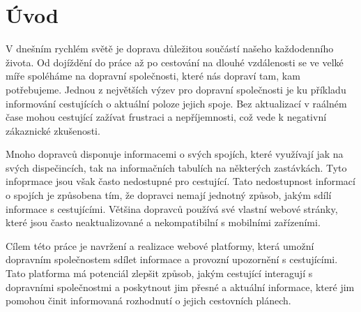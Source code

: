 \chapter{Úvod}
V dnešním rychlém světě je doprava důležitou součástí našeho každodenního života. Od dojíždění do práce až po cestování na dlouhé vzdálenosti se ve velké míře spoléháme na dopravní společnosti, které nás dopraví tam, kam potřebujeme. Jednou z největších výzev pro dopravní společnosti je ku příkladu informování cestujících o aktuální poloze jejich spoje. Bez aktualizací v raálném čase mohou cestující zažívat frustraci a nepříjemnosti, což vede k negativní zákaznické zkušenosti.\par
\hfill\par

Mnoho dopravců disponuje informacemi o svých spojích, které využívají jak na svých dispečincích, tak na informačních tabulích na některých zastávkách. Tyto infoprmace jsou však často nedostupné pro cestující. Tato nedostupnost informací o spojích je způsobena tím, že dopravci nemají jednotný způsob, jakým sdílí informace s cestujícími. Většina dopravců používá své vlastní webové stránky, které jsou často neaktualizované a nekompatibilní s mobilními zařízeními.\par
\hfill\par
Cílem této práce je navržení a realizace webové platformy, která umožní dopravním společnostem sdílet informace a provozní upozornění s cestujícími. Tato platforma má potenciál zlepšit způsob, jakým cestující interagují s dopravními společnostmi a poskytnout jim přesné a aktuální informace, které jim pomohou činit informovaná rozhodnutí o jejich cestovních plánech. 
